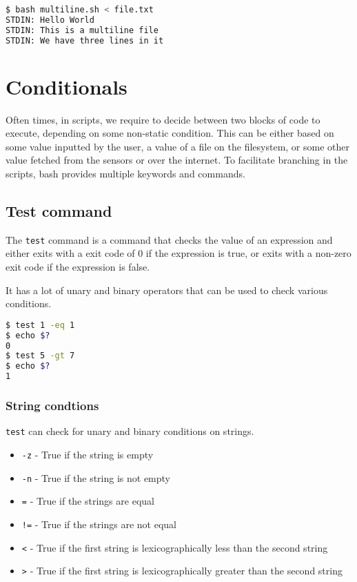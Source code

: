\begin{lstlisting}[language=bash]
$ bash multiline.sh < file.txt
STDIN: Hello World
STDIN: This is a multiline file
STDIN: We have three lines in it
\end{lstlisting}


\section{Conditionals}

Often times, in scripts, we require to decide between two blocks of code to execute, depending on some non-static condition. This can be either based on some value inputted by the user, a value of a file on the filesystem, or some other value fetched from the sensors or over the internet. To facilitate branching in the scripts, bash provides multiple keywords and commands.

\subsection{Test command}

The \lstinline|test| command is a command that checks the value of an expression and either exits with a exit code of 0
if the expression is true, or exits with a non-zero exit code if the expression is false.

It has a lot of unary and binary operators that can be used to check various conditions.

\begin{lstlisting}[language=bash]
$ test 1 -eq 1
$ echo $?
0
$ test 5 -gt 7
$ echo $?
1
\end{lstlisting}

\subsubsection{String condtions}

\lstinline|test| can check for unary and binary conditions on strings.

\begin{itemize}
    \item \lstinline|-z| - True if the string is empty
    \item \lstinline|-n| - True if the string is not empty
    \item \lstinline|=| - True if the strings are equal
    \item \lstinline|!=| - True if the strings are not equal
    \item \lstinline|<| - True if the first string is lexicographically less than the second string
    \item \lstinline|>| - True if the first string is lexicographically greater than the second string
\end{itemize}

